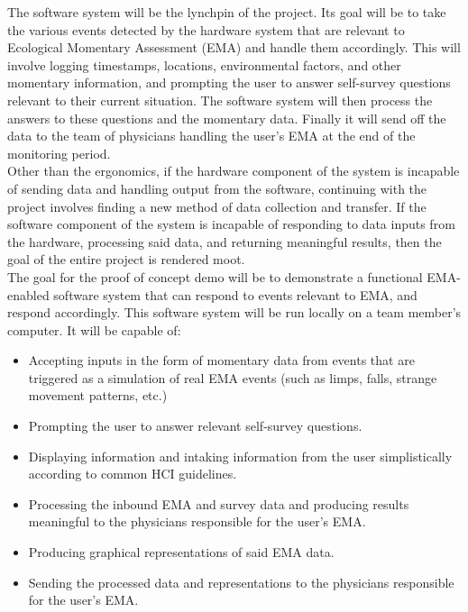 \documentclass[12pt]{article}
\begin{document}
The software system will be the lynchpin of the project. Its goal will be to take the various events detected by the hardware system that are relevant to Ecological Momentary Assessment (EMA) and handle them accordingly. This will involve logging timestamps, locations, environmental factors, and other momentary information, and prompting the user to answer self-survey questions relevant to their current situation. The software system will then process the answers to these questions and the momentary data. Finally it will send off the data to the team of physicians handling the user's EMA at the end of the monitoring period.\\

Other than the ergonomics, if the hardware component of the system is incapable of sending data and handling output from the software, continuing with the project involves finding a new method of data collection and transfer. If the software component of the system is incapable of responding to data inputs from the hardware, processing said data, and returning meaningful results, then the goal of the entire project is rendered moot.\\

The goal for the proof of concept demo will be to demonstrate a functional EMA-enabled software system that can respond to events relevant to EMA, and respond accordingly. This software system will be run locally on a team member's computer. It will be capable of:\\

\begin{itemize}
\item Accepting inputs in the form of momentary data from events that are triggered as a simulation of real EMA events (such as limps, falls, strange movement patterns, etc.)
\item Prompting the user to answer relevant self-survey questions.
\item Displaying information and intaking information from the user simplistically according to common HCI guidelines.
\item Processing the inbound EMA and survey data and producing results meaningful to the physicians responsible for the user's EMA.
\item Producing graphical representations of said EMA data.
\item Sending the processed data and representations to the physicians responsible for the user's EMA.
\end{itemize}
\end{document}
